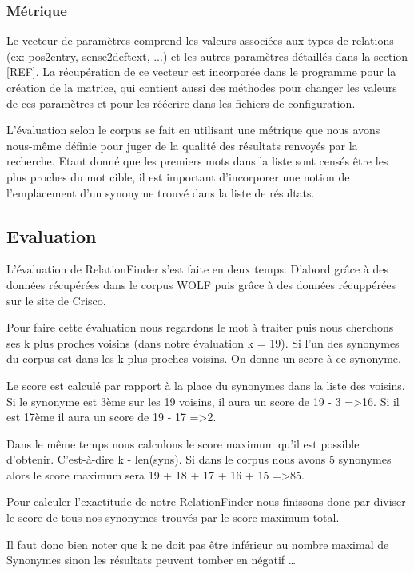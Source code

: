 \subsubsection{Métrique}

Le vecteur de paramètres comprend les valeurs associées aux types de relations 
(ex: pos2entry, sense2deftext, ...) et les autres paramètres détaillés dans la 
section [REF]. La récupération de ce vecteur est incorporée dans le programme 
pour la création de la matrice, qui contient aussi des méthodes pour changer 
les valeurs de ces paramètres et pour les réécrire dans les fichiers de 
configuration.

L'évaluation selon le corpus se fait en utilisant une métrique que nous 
avons nous-même définie pour juger de la qualité des résultats renvoyés par la 
recherche. Etant donné que les premiers mots dans la liste sont censés être les 
plus proches du mot cible, il est important d'incorporer une notion de 
l'emplacement d'un synonyme trouvé dans la liste de résultats.


\subsection{Evaluation}

L'évaluation de RelationFinder s'est faite en deux temps. D'abord grâce à des 
données récupérées dans le corpus WOLF puis grâce à des données récuppérées sur 
le site de Crisco.

Pour faire cette évaluation nous regardons le mot à traiter puis nous cherchons 
ses k plus proches voisins (dans notre évaluation k = 19). Si l'un des 
synonymes du corpus est dans les k plus proches voisins. On donne un score à ce 
synonyme.

Le score est calculé par rapport à la place du synonymes dans la liste des 
voisins. Si le synonyme est 3ème sur les 19 voisins, il aura un score de 19 - 3 
=\textgreater 16. Si il est 17ème il aura un score de 19 - 17 =\textgreater 2.

Dans le même temps nous calculons le score maximum qu'il est possible 
d'obtenir. C'est-à-dire k - len(syns). Si dans le corpus nous avons 5 synonymes 
alors le score maximum sera 19 + 18 + 17 + 16 + 15 =\textgreater 85.

Pour calculer l'exactitude de notre RelationFinder nous finissons donc par 
diviser le score de tous nos synonymes trouvés par le score maximum total.

Il faut donc bien noter que k ne doit pas être inférieur au nombre maximal de 
Synonymes sinon les résultats peuvent tomber en négatif \dots

